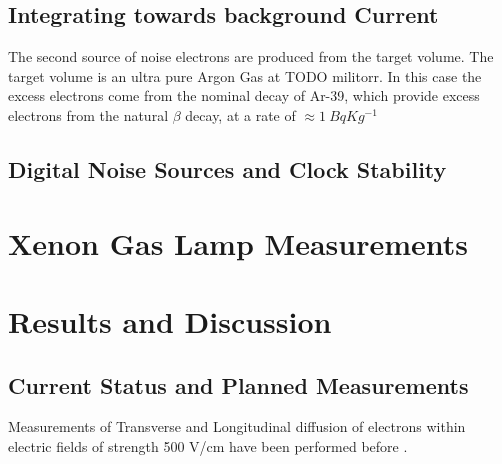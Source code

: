 \subsection{Integrating towards background Current}

The second source of noise electrons are produced from the target volume.
The target volume is an ultra pure Argon Gas at TODO militorr.
In this case the excess electrons come from the nominal decay of Ar-39, which provide excess electrons from the natural $\beta$ decay, at a rate of $\approx 1~\unit{Bq}{Kg^{-1}}$

\subsection{Digital Noise Sources and Clock Stability}


\section{Xenon Gas Lamp Measurements}


\section{Results and Discussion}


\subsection{Current Status and Planned Measurements}

Measurements of Transverse and Longitudinal diffusion of electrons within electric fields of strength 500 V/cm have been performed before \citep{lar_diffusion_measurement_LI2016160}.
